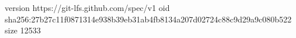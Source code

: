 version https://git-lfs.github.com/spec/v1
oid sha256:27b27c11f0871314e938b39eb31ab4fb8134a207d02724c88c9d29a9c080b522
size 12533
